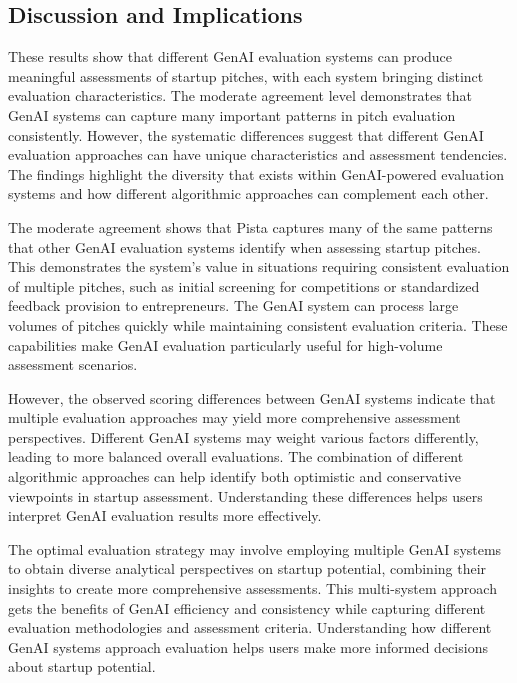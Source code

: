 \subsection{Discussion and Implications}

These results show that different GenAI evaluation systems can produce meaningful assessments of startup pitches, with each system bringing distinct evaluation characteristics. The moderate agreement level demonstrates that GenAI systems can capture many important patterns in pitch evaluation consistently. However, the systematic differences suggest that different GenAI evaluation approaches can have unique characteristics and assessment tendencies. The findings highlight the diversity that exists within GenAI-powered evaluation systems and how different algorithmic approaches can complement each other.

The moderate agreement shows that Pista captures many of the same patterns that other GenAI evaluation systems identify when assessing startup pitches. This demonstrates the system's value in situations requiring consistent evaluation of multiple pitches, such as initial screening for competitions or standardized feedback provision to entrepreneurs. The GenAI system can process large volumes of pitches quickly while maintaining consistent evaluation criteria. These capabilities make GenAI evaluation particularly useful for high-volume assessment scenarios.

However, the observed scoring differences between GenAI systems indicate that multiple evaluation approaches may yield more comprehensive assessment perspectives. Different GenAI systems may weight various factors differently, leading to more balanced overall evaluations. The combination of different algorithmic approaches can help identify both optimistic and conservative viewpoints in startup assessment. Understanding these differences helps users interpret GenAI evaluation results more effectively.

The optimal evaluation strategy may involve employing multiple GenAI systems to obtain diverse analytical perspectives on startup potential, combining their insights to create more comprehensive assessments. This multi-system approach gets the benefits of GenAI efficiency and consistency while capturing different evaluation methodologies and assessment criteria. Understanding how different GenAI systems approach evaluation helps users make more informed decisions about startup potential.
